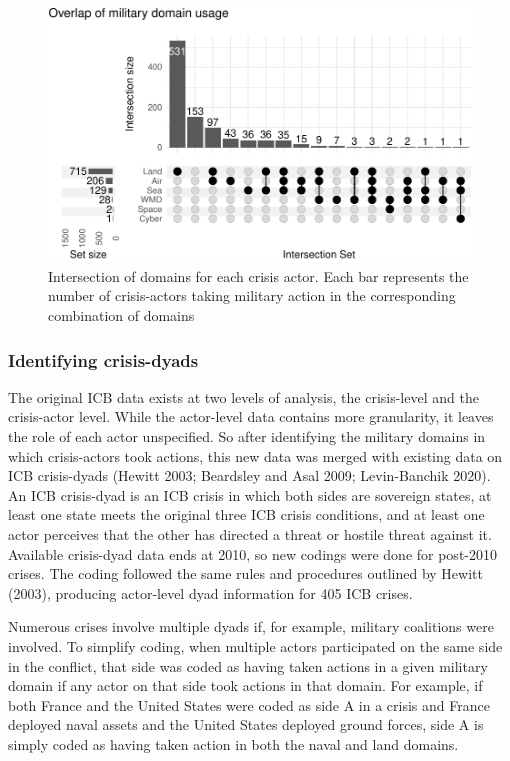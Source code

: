 \documentclass[
]{article}
\begin{document}
\begin{figure}[h!]

{\centering \includegraphics{2022-04-07_ICB-Domains_files/figure-latex/domain-combos-1} 

}

\caption{Intersection of domains for each crisis actor. Each bar represents the number of crisis-actors taking military action in the corresponding combination of domains}\label{fig:domain-combos}
\end{figure}

\hypertarget{identifying-crisis-dyads}{%
\subsubsection{Identifying crisis-dyads}\label{identifying-crisis-dyads}}

The original ICB data exists at two levels of analysis, the crisis-level and the crisis-actor level. While the actor-level data contains more granularity, it leaves the role of each actor unspecified. So after identifying the military domains in which crisis-actors took actions, this new data was merged with existing data on ICB crisis-dyads (Hewitt 2003; Beardsley and Asal 2009; Levin-Banchik 2020). An ICB crisis-dyad is an ICB crisis in which both sides are sovereign states, at least one state meets the original three ICB crisis conditions, and at least one actor perceives that the other has directed a threat or hostile threat against it. Available crisis-dyad data ends at 2010, so new codings were done for post-2010 crises. The coding followed the same rules and procedures outlined by Hewitt (2003), producing actor-level dyad information for 405 ICB crises.

Numerous crises involve multiple dyads if, for example, military coalitions were involved. To simplify coding, when multiple actors participated on the same side in the conflict, that side was coded as having taken actions in a given military domain if any actor on that side took actions in that domain. For example, if both France and the United States were coded as side A in a crisis and France deployed naval assets and the United States deployed ground forces, side A is simply coded as having taken action in both the naval and land domains.
\end{document}
